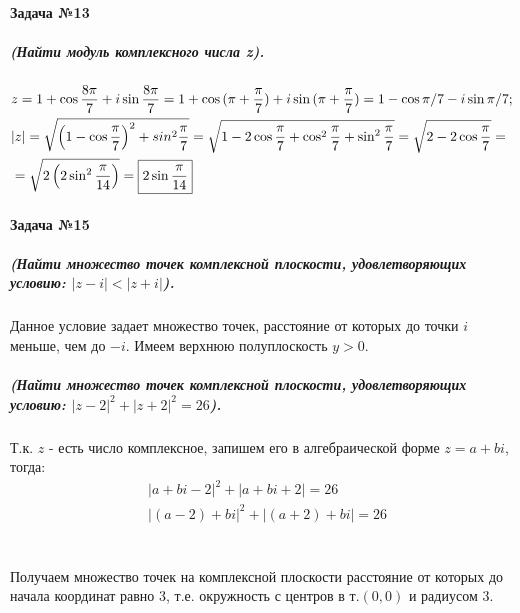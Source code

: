 \documentclass[a4paper,12pt]{report}
\begin{document}
\paragraph{Задача №13}
\subparagraph{(Найти модуль комплексного числа z).}

\begin{align*}
	&z=1+\cos{\dfrac{8\pi}{7}}+i\sin{\dfrac{8\pi}{7}}=	
	1+\cos{(\pi+\dfrac{\pi}{7})}+i\sin{(\pi+\dfrac{\pi}{7})}=	
	1-\cos\pi/7-i\sin\pi/7;\\
	&|z|=\sqrt{\left(1-\cos{\dfrac{\pi}{7}}\right)^2+sin^2{\dfrac{\pi}{7}}}=
	\sqrt{1-2\cos{\dfrac{\pi}{7}}+
	\cos^2{\dfrac{\pi}{7}}+\sin^2\dfrac{\pi}{7}}=
	\sqrt{2-2\cos{\dfrac{\pi}{7}}}=\\
	&=\sqrt{2\left(2\sin^2{\dfrac{\pi}{14}}\right)}=
	\fbox{$ 2\sin{\dfrac{\pi}{14}} $}
\end{align*}
 
\paragraph{Задача №15}
\subparagraph{(Найти множество точек комплексной плоскости, удовлетворяющих условию: $ |z-i|<|z+i| $).} 
Данное условие задает множество точек, расстояние от которых 
до точки $ i $ меньше, чем до $ -i $. Имеем верхнюю полуплоскость $ y>0 $.

\subparagraph{(Найти множество точек комплексной плоскости, удовлетворяющих условию: $ |z-2|^2+|z+2|^2=26 $).\\}
Т.к. $ z $ - есть число комплексное, запишем его в алгебраической форме
$ z=a+bi $, тогда:
\begin{align*}
	&|a+bi-2|^2+|a+bi+2|=26\\
	&|(a-2)+bi|^2+|(a+2)+bi|=26\\
\end{align*}


\begin{align*}
	
\end{align*}

Получаем множество точек на комплексной плоскости расстояние от которых до начала координат равно 3, т.е. окружность с центров в т.$ (0, 0) $ и радиусом 3.
\end{document}

